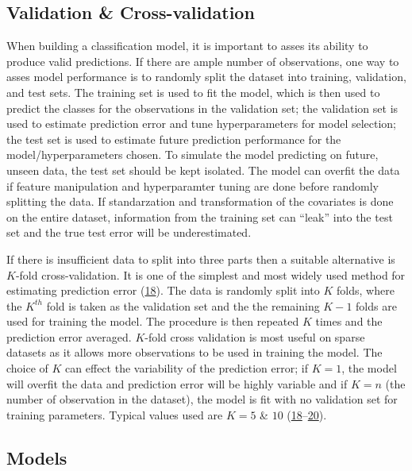 \documentclass[12pt,]{article}
\begin{document}
\subsection{Validation \&
Cross-validation}\label{validation-cross-validation}

When building a classification model, it is important to asses its
ability to produce valid predictions. If there are ample number of
observations, one way to asses model performance is to randomly split
the dataset into training, validation, and test sets. The training set
is used to fit the model, which is then used to predict the classes for
the observations in the validation set; the validation set is used to
estimate prediction error and tune hyperparameters for model selection;
the test set is used to estimate future prediction performance for the
model/hyperparameters chosen. To simulate the model predicting on
future, unseen data, the test set should be kept isolated. The model can
overfit the data if feature manipulation and hyperparamter tuning are
done before randomly splitting the data. If standarzation and
transformation of the covariates is done on the entire dataset,
information from the training set can ``leak'' into the test set and the
true test error will be underestimated.

If there is insufficient data to split into three parts then a suitable
alternative is \(K\)-fold cross-validation. It is one of the simplest
and most widely used method for estimating prediction error
(\protect\hyperlink{ref-hastie_elements_2009}{18}). The data is randomly
split into \(K\) folds, where the \(K^{th}\) fold is taken as the
validation set and the the remaining \(K-1\) folds are used for training
the model. The procedure is then repeated \(K\) times and the prediction
error averaged. \(K\)-fold cross validation is most useful on sparse
datasets as it allows more observations to be used in training the
model. The choice of \(K\) can effect the variability of the prediction
error; if \(K=1\), the model will overfit the data and prediction error
will be highly variable and if \(K=n\) (the number of observation in the
dataset), the model is fit with no validation set for training
parameters. Typical values used are \(K=5\) \& \(10\)
(\protect\hyperlink{ref-hastie_elements_2009}{18}--\protect\hyperlink{ref-kohavi_study_1995}{20}).

\subsection{Models}\label{models}
\end{document}
